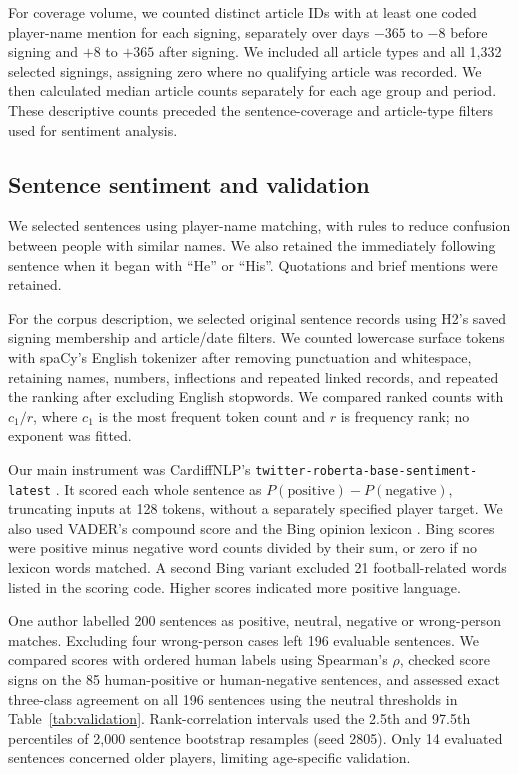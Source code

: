 For coverage volume, we counted distinct article IDs with at least one coded player-name mention for each signing, separately over days $-365$ to $-8$ before signing and $+8$ to $+365$ after signing. We included all article types and all 1,332 selected signings, assigning zero where no qualifying article was recorded. We then calculated median article counts separately for each age group and period. These descriptive counts preceded the sentence-coverage and article-type filters used for sentiment analysis.

\subsection*{Sentence sentiment and validation}

We selected sentences using player-name matching, with rules to reduce confusion between people with similar names. We also retained the immediately following sentence when it began with ``He'' or ``His''. Quotations and brief mentions were retained.

For the corpus description, we selected original sentence records using H2's saved signing membership and article/date filters. We counted lowercase surface tokens with spaCy's English tokenizer after removing punctuation and whitespace, retaining names, numbers, inflections and repeated linked records, and repeated the ranking after excluding English stopwords. We compared ranked counts with $c_1/r$, where $c_1$ is the most frequent token count and $r$ is frequency rank; no exponent was fitted.

Our main instrument was CardiffNLP's \nolinkurl{twitter-roberta-base-sentiment-latest} \cite{liu2019roberta,loureiro2022timelms,camachocollados2022tweetnlp,cardiffnlp2022checkpoint}. It scored each whole sentence as $P(\mathrm{positive})-P(\mathrm{negative})$, truncating inputs at 128 tokens, without a separately specified player target. We also used VADER's compound score \cite{hutto2014vader,vader_documentation} and the Bing opinion lexicon \cite{hu2004mining,textdata_bing_documentation}. Bing scores were positive minus negative word counts divided by their sum, or zero if no lexicon words matched. A second Bing variant excluded 21 football-related words listed in the scoring code. Higher scores indicated more positive language.

One author labelled 200 sentences as positive, neutral, negative or wrong-person matches. Excluding four wrong-person cases left 196 evaluable sentences. We compared scores with ordered human labels using Spearman's $\rho$, checked score signs on the 85 human-positive or human-negative sentences, and assessed exact three-class agreement on all 196 sentences using the neutral thresholds in Table~\ref{tab:validation}. Rank-correlation intervals used the 2.5th and 97.5th percentiles of 2,000 sentence bootstrap resamples (seed 2805). Only 14 evaluated sentences concerned older players, limiting age-specific validation.

